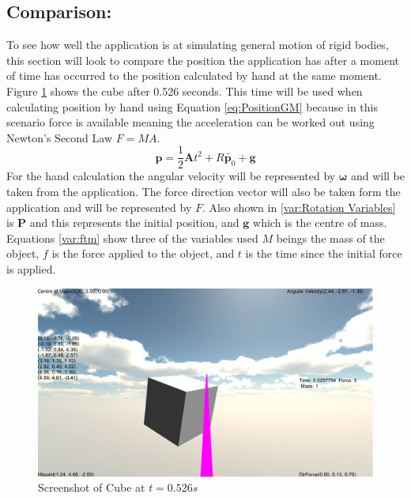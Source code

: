 \subsection{Comparison:}
To see how well the application is at simulating general motion of rigid bodies, this section will look to compare the position the application has after a moment of time has occurred to the position calculated by hand at the same moment.
Figure \ref{fig:ScreenShotSingle} shows the cube after 0.526 seconds.
This time will be used when calculating position by hand using Equation \ref{eq:PositionGM} because in this scenario force is available meaning the acceleration can be worked out using Newton's Second Law $F=MA$.
\begin{equation}\label{eq:PositionGM}
\mathbf{p}=\frac{1}{2}\mathbf{A}t^{2}+{R}\tilde{\mathbf{p}_{0}}+\mathbf{g}
\end{equation}
For the hand calculation the angular velocity will be represented by $\boldsymbol{\omega}$ and will be taken from the application.
The force direction vector will also be taken form the application and will be represented by $F$.
Also shown in \ref{var:Rotation Variables} is $\mathbf{P}$ and this represents the initial position, and $\mathbf{g}$ which is the centre of mass.
Equations \ref{var:ftm} show three of the variables used $M$ beings the mass of the object, $f$ is the force applied to the object, and $t$ is the time since the initial force is applied. 
\begin{figure}[h!]
	\centering
	\includegraphics[width=\textwidth]{images/Screenshot2.PNG}
	\caption{Screenshot of Cube at $t = 0.526 s$}
	\label{fig:ScreenShotSingle}
\end{figure}
